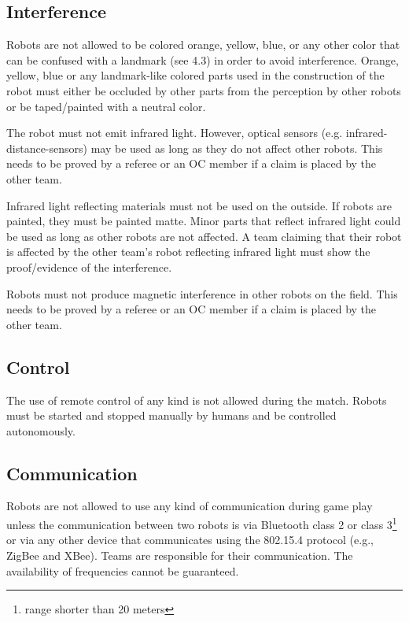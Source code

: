 \documentclass{article}
\begin{document}
\subsection{ Interference \label{ref-interference}}

Robots are not allowed to be colored orange, yellow, blue, or any other color
that can be confused with a landmark (see 4.3) in order to avoid interference.
Orange, yellow, blue or any landmark-like colored parts used in the
construction of the robot must either be occluded by other parts from the
perception by other robots or be taped/painted with a neutral color.

The robot must not emit infrared light. However, optical sensors (e.g.
infrared-distance-sensors) may be used as long as they do not affect other
robots. This needs to be proved by a referee or an OC member if a claim is
placed by the other team.

Infrared light reflecting materials must not be used on the outside. If robots
are painted, they must be painted matte. Minor parts that reflect infrared
light could be used as long as other robots are not affected. A team claiming
that their robot is affected by the other team's robot reflecting infrared
light must show the proof/evidence of the interference.

Robots must not produce magnetic interference in other robots on the field.
This needs to be proved by a referee or an OC member if a claim is placed by
the other team.


\subsection{ Control \label{ref-control}}

The use of remote control of any kind is not allowed during the match. Robots
must be started and stopped manually by humans and be controlled autonomously.

\subsection{ Communication \label{ref-022}}

Robots are not allowed to use any kind of communication during game play unless
the communication between two robots is via Bluetooth class 2 or class
3\footnote{range shorter than 20 meters} or via any other device that
communicates using the 802.15.4 protocol (e.g., ZigBee and XBee). Teams are
responsible for their communication. The availability of frequencies cannot be
guaranteed.
\end{document}

